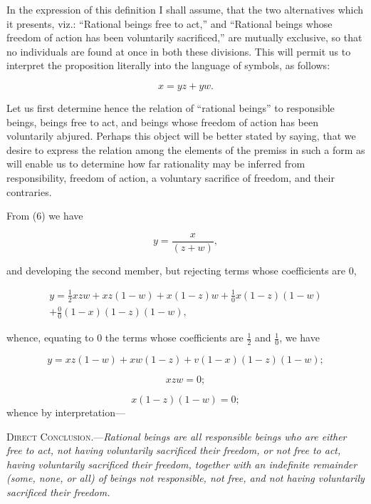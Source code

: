 \documentclass[oneside]{book}
\begin{document}
In the expression of this definition I shall assume, that the
two alternatives which it presents, viz.: ``Rational beings free
to act,'' and ``Rational beings whose freedom of action has been
voluntarily sacrificed,'' are mutually exclusive, so that no individuals
are found at once in both these divisions. This will permit
us to interpret the proposition literally into the language of
symbols, as follows:

\begin{equation}
x = yz + yw.
\end{equation}

Let us first determine hence the relation of ``rational beings'' to
responsible beings, beings free to act, and beings whose freedom
of action has been voluntarily abjured. Perhaps this object will
be better stated by saying, that we desire to express the relation
among the elements of the premiss in such a form as will enable
us to determine how far rationality may be inferred from responsibility,
freedom of action, a voluntary sacrifice of freedom, and
their contraries.

From (6) we have

\[
y = \frac{x}{(z + w)},
\]

and developing the second member, but rejecting terms whose
coefficients are 0,

\begin{eqnarray*}
y = \frac{1}{2}xzw + xz(1-w) + x(1-z)w + \frac{1}{0}x(1-z)(1-w)\\
                                       + \frac{0}{0}(1-x)(1-z)(1-w),
\end{eqnarray*}

whence, equating to 0 the terms whose coefficients are $\frac{1}{2}$ and $\frac{1}{0}$,
we have

\begin{equation}
y = xz(1-w) + xw(1-z) + v(1-x)(1-z)(1-w);
\end{equation}

\begin{equation}
xzw = 0;
\end{equation}

\begin{equation}
x(1-z)(1-w)= 0;
\end{equation}
whence by interpretation---

\textsc{Direct Conclusion}.---\textit{Rational beings are all responsible beings
who are either free to act, not having voluntarily sacrificed their freedom, or not free to act, having voluntarily sacrificed their freedom,
together with an indefinite remainder (some, none, or all) of beings
not responsible, not free, and not having voluntarily sacrificed their
freedom.}
\end{document}
